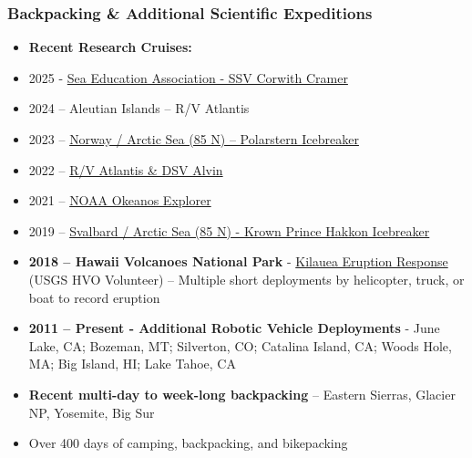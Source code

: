 \documentclass[11pt,letterpaper]{article}
\begin{document}
\subsubsection*{Backpacking \& Additional Scientific Expeditions}
\begin{itemize}
\item \textbf{Recent Research Cruises:}
\item 2025 - \href{https://sea.edu/news/uncategorized/kicking-off-the-sea-marine-robotics-program-at-caltech/}{Sea Education Association - SSV Corwith Cramer}
\item 2024 – Aleutian Islands – R/V Atlantis
\item 2023 – \href{https://ai.jpl.nasa.gov/public/documents/papers/german-absicon-2024.pdf}{Norway / Arctic Sea (85 N) – Polarstern Icebreaker}
\item 2022 – \href{https://ndsf.whoi.edu/from-deep-space-to-the-deep-sea/}{R/V Atlantis \& DSV Alvin}
\item 2021 – \href{https://oceanexplorer.noaa.gov/multimedia/daily-image-media-20210622/}{NOAA Okeanos Explorer}
\item 2019 – \href{https://haconfrinatek.wordpress.com/}{Svalbard / Arctic Sea (85 N) - Krown Prince Hakkon Icebreaker}
\item \textbf{2018 – Hawaii Volcanoes National Park} - \href{https://www.usgs.gov/volcanoes/kilauea/kilauea-2018-summit-collapse-and-lower-east-rift-zone-eruption}{Kilauea Eruption Response} (USGS HVO Volunteer) – Multiple short deployments by helicopter, truck, or boat to record eruption
\item \textbf{2011 – Present - Additional Robotic Vehicle Deployments} - June Lake, CA; Bozeman, MT; Silverton, CO; Catalina Island, CA; Woods Hole, MA; Big Island, HI; Lake Tahoe, CA
\item \textbf{Recent multi-day to week-long backpacking} – Eastern Sierras, Glacier NP, Yosemite, Big Sur
\item Over 400 days of camping, backpacking, and bikepacking
\end{itemize}
\end{document}
